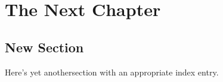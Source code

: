 
\chapter[THE NEXT CHAPTER]{The Next Chapter}

\section{New Section}
Here's yet anothersection with an appropriate
index entry.
